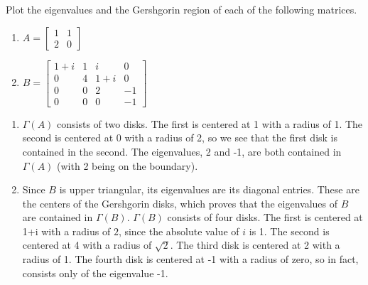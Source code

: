 \documentclass{ximera}
\begin{document}
\begin{example}
Plot the eigenvalues and the Gershgorin region of each of the following matrices.
\begin{enumerate}
    \item $A=\begin{bmatrix}
    1 & 1 \\
    2 & 0 \end{bmatrix}$
    \item $B=\begin{bmatrix}
    1+i & 1 & i & 0\\ 
    0 & 4 & 1+i & 0\\ 
    0 & 0 & 2 & -1 \\
    0 & 0 & 0 & -1\end{bmatrix}$
\end{enumerate}

\begin{explanation}
 

\begin{enumerate}
    \item $\Gamma(A)$ consists of two disks.  The first is centered at 1 with a radius of 1.  The second is centered at 0 with a radius of 2, so we see that the first disk is contained in the second.  The eigenvalues, 2 and -1, are both contained in $\Gamma(A)$ (with 2 being on the boundary).
    \item Since $B$ is upper triangular, its eigenvalues are its diagonal entries.  These are the centers of the Gershgorin disks, which proves that the eigenvalues of $B$ are contained in $\Gamma(B)$.  $\Gamma(B)$ consists of four disks.  The first is centered at 1+i with a radius of $2$, since the absolute value of $i$ is 1.   The second is centered at 4 with a radius of $\sqrt{2}$.  The third disk is centered at 2 with a radius of 1.  The fourth disk is centered at -1 with a radius of zero, so in fact, consists only of the eigenvalue -1.
\end{enumerate}

\end{explanation}
\end{example}
\end{document}
